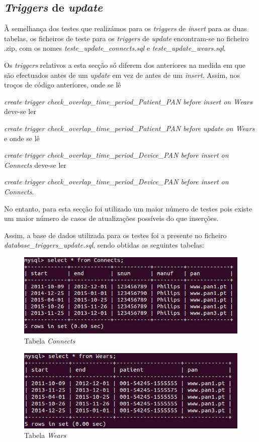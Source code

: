 \documentclass[a4paper]{article}
\begin{document}
\subsection{\textit{Triggers} de \textit{update}}
À semelhança dos testes que realizámos para os \textit{triggers} de \textit{insert} para as duas tabelas, os ficheiros de teste para os \textit{triggers} de \textit{update} encontram-se no ficheiro .zip, com os nomes \textit{teste\_update\_connects.sql} e \textit{teste\_update\_wears.sql}.

Os \textit{triggers} relativos a esta secção só diferem dos anteriores na medida em que são efectuados antes de um \textit{update} em vez de antes de um \textit{insert}. Assim, nos troços de código anteriores, onde se lê 

\textit{create trigger check\_overlap\_time\_period\_Patient\_PAN before insert on Wears} deve-se ler

 \textit{create trigger check\_overlap\_time\_period\_Patient\_PAN before update on Wears} e onde se lê
 
  \textit{create trigger check\_overlap\_time\_period\_Device\_PAN before insert on Connects} deve-se ler
  
   \textit{create trigger check\_overlap\_time\_period\_Device\_PAN before insert on Connects}.

No entanto, para esta secção foi utilizado um maior número de testes pois existe um maior número de casos de atualizações possíveis do que inserções.

Assim, a base de dados utilizada para os testes foi a presente no ficheiro \textit{database\_triggers\_update.sql}, sendo obtidas as seguintes tabelas:

\begin{figure}[ht!]
\centering
\includegraphics[scale=0.5]{update_connects.jpg}
\caption{Tabela \textit{Connects}}
\end{figure}

\begin{figure}[ht!]
\centering
\includegraphics[scale=0.5]{update_wears.jpg}
\caption{Tabela \textit{Wears}}
\end{figure}
\end{document}
